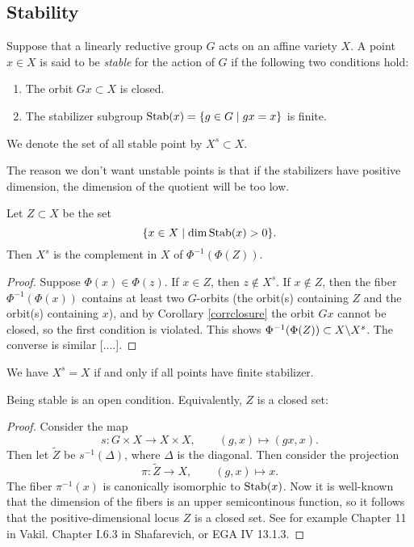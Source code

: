 \documentclass[11pt, english]{article}
\begin{document}
\subsection{Stability}

\begin{defi}
Suppose that a linearly reductive group $G$ acts on an affine variety $X$. A point $x \in X$ is said to be \emph{stable} for the action of $G$ if the following two conditions hold:
\begin{enumerate}
\item The orbit $Gx \subset X$ is closed.
\item The stabilizer subgroup $\text{Stab}(x) = \{ g \in G \mid gx=x\}$ is finite.
\end{enumerate}
We denote the set of all stable point by $X^s \subset X$.
\end{defi}

The reason we don't want unstable points is that if the stabilizers have positive dimension, the dimension of the quotient will be too low.

\begin{prop}
Let $Z \subset X$ be the set
\[
\{ x \in X \mid \dim \text{Stab}(x) > 0 \} .
\]
Then $X^s$ is the complement in $X$ of $\Phi^{-1}(\Phi(Z))$.
\end{prop}
\begin{proof}
Suppose $\Phi(x) \in \Phi(z)$. If $x \in Z$, then $z \not \in X^s$. If $x \not \in Z$, then the fiber $\Phi^{-1}(\Phi(x))$ contains at least two $G$-orbits (the orbit(s) containing $Z$ and the orbit(s) containing $x$), and by Corollary \ref{corrclosure} the orbit $Gx$ cannot be closed, so the first condition is violated. This shows $\Phi^{-1}(\Phi(Z)) \subset X \backslash X^s$. The converse is similar [....].
\end{proof}

\begin{remark}
We have $X^s=X$ if and only if all points have finite stabilizer.
\end{remark}

Being stable is an open condition. Equivalently, $Z$ is a closed set:
\begin{proof}
Consider the map 
\[
s:G \times X \to X \times X, \qquad (g,x) \mapsto (gx,x).
\]
Then let $\widetilde{Z}$ be $s^{-1}(\Delta)$, where $\Delta$ is the diagonal. Then consider the projection
\[
\pi:\widetilde{Z} \to X, \qquad (g,x) \mapsto x.
\]
The fiber $\pi^{-1}(x)$ is canonically isomorphic to $\text{Stab}(x)$. Now it is well-known that the dimension of the fibers is an upper semicontinous function, so it follows that the positive-dimensional locus $Z$ is a closed set. See for example Chapter 11 in Vakil. Chapter I.6.3 in Shafarevich, or EGA IV 13.1.3. 
\end{proof}
\end{document}

